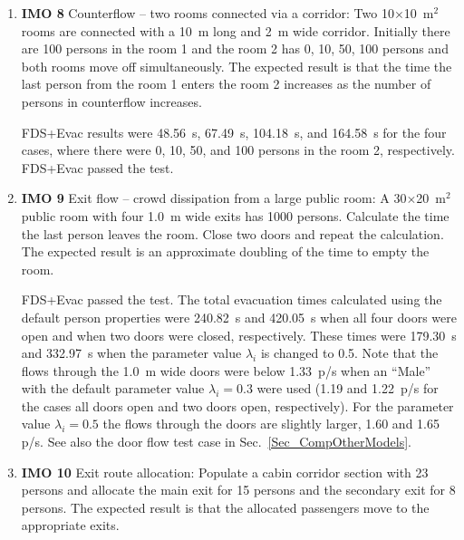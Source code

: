 \documentclass[12pt,a4paper,final,twoside]{stylevk}
\begin{document}
%
\begin{enumerate}
%
\item \textbf{IMO 8} Counterflow -- two rooms connected via a
  corridor: Two 10$\times$10~$\mathrm{m^2}$ rooms are connected with a
  10~m long and 2~m wide corridor.  Initially there are 100 persons in
  the room 1 and the room 2 has 0, 10, 50, 100 persons and both rooms
  move off simultaneously.  The expected result is that the time the
  last person from the room 1 enters the room 2 increases as the
  number of persons in counterflow increases.
  
  FDS+Evac results were 48.56~s, 67.49~s, 104.18~s, and 164.58~s for
  the four cases, where there were 0, 10, 50, and 100 persons in the
  room 2, respectively.  FDS+Evac passed the test.
%
\item \textbf{IMO 9} Exit flow -- crowd dissipation from a large
  public room: A 30$\times$20~$\mathrm{m^2}$ public room with four
  1.0~m wide exits has 1000 persons.  Calculate the time the last
  person leaves the room.  Close two doors and repeat the calculation.
  The expected result is an approximate doubling of the time to empty
  the room.
  
  FDS+Evac passed the test.  The total evacuation times calculated
  using the default person properties were 240.82~s and 420.05~s when
  all four doors were open and when two doors were closed,
  respectively.  These times were 179.30~s and 332.97~s when the
  parameter value $\lambda_i$ is changed to 0.5.  Note that the flows
  through the 1.0~m wide doors were below 1.33~p/s when an ``Male''
  with the default parameter value $\lambda_i = 0.3$ were used (1.19
  and 1.22~p/s for the cases all doors open and two doors open,
  respectively).  For the parameter value $\lambda_i = 0.5$ the flows
  through the doors are slightly larger, 1.60 and 1.65 p/s.  See also
  the door flow test case in Sec.~\ref{Sec_CompOtherModels}.
%
\item \textbf{IMO 10} Exit route allocation: Populate a cabin corridor
  section with 23 persons and allocate the main exit for 15 persons
  and the secondary exit for 8 persons.  The expected result is that
  the allocated passengers move to the appropriate exits.
  

\end{enumerate}
\end{document}
